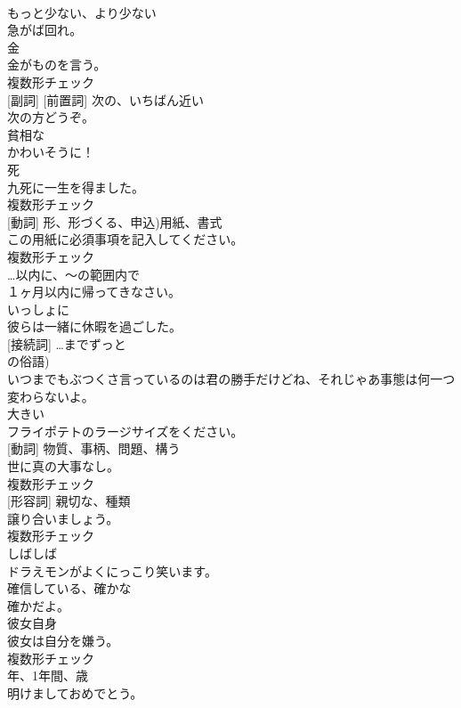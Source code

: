 \documentclass[8pt]{extreport}
\begin{document}
\begin{CJK}{UTF8}{min}
\\	[形容詞]	もっと少ない、より少ない	
\\	急がば回れ。	
\\	[名詞]	金	
\\	金がものを言う。	
\\	複数形チェック
\\	[形容詞] [副詞] [前置詞]	次の、いちばん近い	
\\	次の方どうぞ。	
\\	[形容詞]	貧相な	
\\	かわいそうに！	
\\	[名詞]	死	
\\	九死に一生を得ました。	
\\	複数形チェック
\\	[名詞] [動詞]	形、形づくる、申込)用紙、書式	
\\	この用紙に必須事項を記入してください。	
\\	複数形チェック
\\	[前置詞]	…以内に、〜の範囲内で	
\\	１ヶ月以内に帰ってきなさい。	
\\	[副詞]	いっしょに	
\\	彼らは一緒に休暇を過ごした。	
\\	[前置詞] [接続詞]	…までずっと 
\\	の俗語)	
\\	いつまでもぶつくさ言っているのは君の勝手だけどね、それじゃあ事態は何一つ変わらないよ。	
\\	[形容詞]	大きい	
\\	フライポテトのラージサイズをください。	
\\	[名詞] [動詞]	物質、事柄、問題、構う	
\\	世に真の大事なし。	
\\	複数形チェック
\\	[名詞] [形容詞]	親切な、種類	
\\	譲り合いましょう。	
\\	複数形チェック
\\	[副詞]	しばしば	
\\	ドラえモンがよくにっこり笑います。	
\\	[形容詞]	確信している、確かな	
\\	確かだよ。	
\\	[代名詞]	彼女自身	
\\	彼女は自分を嫌う。	
\\	複数形チェック
\\	[名詞]	年、1年間、歳	
\\	明けましておめでとう。	

\end{CJK}
\end{document}
